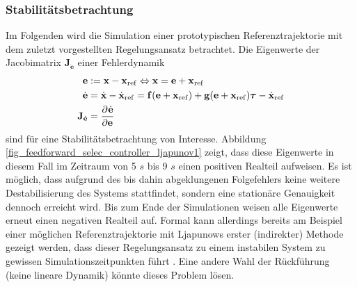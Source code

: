 \subsubsection{Stabilitätsbetrachtung}
Im Folgenden wird die Simulation einer prototypischen Referenztrajektorie mit dem zuletzt vorgestellten Regelungsansatz betrachtet. Die Eigenwerte der Jacobimatrix $\mathbf{J}_{\dot{\mathbf{e}}}$ einer Fehlerdynamik
\begin{align}
	\mathbf{e} &:= \mathbf{x} - \mathbf{x}_{\mathrm{ref}} \Leftrightarrow \mathbf{x} = \mathbf{e} + \mathbf{x}_{\mathrm{ref}} \\
	\dot{\mathbf{e}} &= \dot{\mathbf{x}} - \dot{\mathbf{x}}_{\mathrm{ref}} = \mathbf{f}(\mathbf{e} + \mathbf{x}_{\mathrm{ref}}) + \mathbf{g}(\mathbf{e} + \mathbf{x}_{\mathrm{ref}}) \boldsymbol{\tau} - \dot{\mathbf{x}}_{\mathrm{ref}} \\
	\mathbf{J}_{\dot{\mathbf{e}}} &= \frac{\partial^{}\dot{\mathbf{e}}}{\partial{\mathbf{e}}^{}}
\end{align}
sind für eine Stabilitätsbetrachtung von Interesse. Abbildung \ref{fig_feedforward_selec_controller_ljapunov1} zeigt, dass diese Eigenwerte in diesem Fall im Zeitraum von 5 $\si{s}$ bis 9 $\si{s}$ einen positiven Realteil aufweisen. Es ist möglich, dass aufgrund des bis dahin abgeklungenen Folgefehlers keine weitere Destabilisierung des Systems stattfindet, sondern eine stationäre Genauigkeit dennoch erreicht wird. Bis zum Ende der Simulationen weisen alle Eigenwerte erneut einen negativen Realteil auf. Formal kann allerdings bereits am Beispiel einer möglichen Referenztrajektorie mit Ljapunows erster (indirekter) Methode gezeigt werden, dass dieser Regelungsansatz zu einem instabilen System zu gewissen Simulationszeitpunkten führt \cite[Vorlesung 4]{NLRT_Winkler2020}. Eine andere Wahl der Rückführung (keine lineare Dynamik) könnte dieses Problem lösen.


